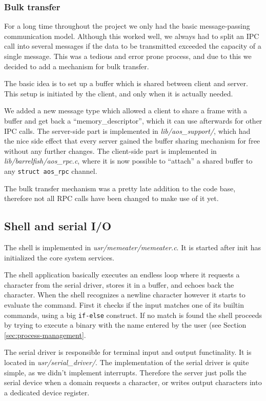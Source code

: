 \documentclass[a4paper,10pt]{article}
\newcommand{\filepath}[1]{\emph{ #1}}
\begin{document}
\subsubsection{Bulk transfer}

For a long time throughout the project we only had the basic message-passing communication model.
Although this worked well, we always had to split an IPC call into several messages if the data to be transmitted exceeded the capacity of a single message.
This was a tedious and error prone process, and due to this we decided to add a mechanism for bulk transfer.

The basic idea is to set up a buffer which is shared between client and server.
This setup is initiated by the client, and only when it is actually needed.

We added a new message type which allowed a client to share a frame with a buffer and get back a ``memory\_descriptor'', which it can use afterwards for other IPC calls.
The server-side part is implemented in \filepath{lib/aos\_support/}, which had the nice side effect that every server gained the buffer sharing mechanism for free without any further changes.
The client-side part is implemented in \filepath{lib/barrelfish/aos\_rpc.c}, where it is now possible to ``attach'' a shared buffer to any \lstinline!struct aos_rpc! channel.

The bulk transfer mechanism was a pretty late addition to the code base, therefore not all RPC calls have been changed to make use of it yet.


\subsection{Shell and serial I/O}

The shell is implemented in \filepath{usr/memeater/memeater.c}.
It is started after init has initialized the core system services.

The shell application basically executes an endless loop where it requests a character from the serial driver, stores it in a buffer, and echoes back the character.
When the shell recognizes a newline character however it starts to evaluate the command.
First it checks if the input matches one of its builtin commands, using a big \lstinline!if-else! construct.
If no match is found the shell proceeds by trying to execute a binary with the name entered by the user (see Section \ref{sec:process-management}.

The serial driver is responsible for terminal input and output functinality.
It is located in \filepath{usr/serial\_driver/}.
The implementation of the serial driver is quite simple, as we didn't implement interrupts.
Therefore the server just polls the serial device when a domain requests a character, or writes output characters into a dedicated device register.
\end{document}
